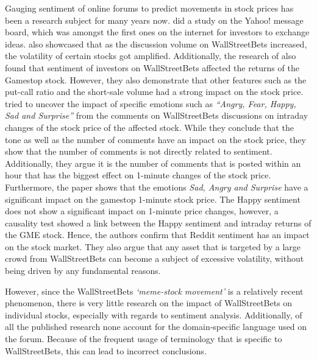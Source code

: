 \documentclass[11pt, a4paper]{article}
\begin{document}
Gauging sentiment of online forums to predict movements in stock prices has been a research subject for many years now. 
\cite{das2007yahoo} did a study on the Yahoo! message board, which was amongst the first ones on the internet for investors to exchange ideas. 
\cite{lyocsa2021yolotrading} also showcased that as the discussion volume on WallStreetBets increased, the volatility of certain stocks got amplified. 
Additionally, the research of \cite{umar2021ataleofcompanyfundamentals} also found that sentiment of investors on WallStreetBets affected the returns of the Gamestop stock. 
However, they also demonstrate that other features such as the put-call ratio and the short-sale volume had a strong impact on the stock price. \\
\cite{long2021LikeTheStock} tried to uncover the impact of specific emotions such as \emph{“Angry, Fear, Happy, Sad and Surprise”} from the comments on 
WallStreetBets discussions on intraday changes of the stock price of the affected stock. While they conclude that the tone as well as the number of 
comments have an impact on the stock price, they show that the number of comments is not directly related to sentiment. Additionally, they argue it 
is the number of comments that is posted within an hour that has the biggest effect on 1-minute changes of the stock price. Furthermore, the paper 
shows that the emotions \emph{Sad, Angry and Surprise} have a significant impact on the gamestop 1-minute stock price. The Happy sentiment does not show a 
significant impact on 1-minute price changes, however, a causality test showed a link between the Happy sentiment and intraday returns of the GME stock. 
Hence, the authors confirm that Reddit 
sentiment has an impact on the stock market. They also argue that any asset that is targeted by a large crowd from WallStreetBets can become a subject 
of excessive volatility, without being driven by any fundamental reasons.

However, since the WallStreetBets \emph{‘meme-stock movement’} is a relatively recent phenomenon, there is very little research on the impact of 
WallStreetBets on individual stocks, especially with regards to sentiment analysis. Additionally, of all the published research none account 
for the domain-specific language used on the forum. Because of the frequent usage of terminology that is specific to WallStreetBets, 
this can lead to incorrect conclusions.
\end{document}
